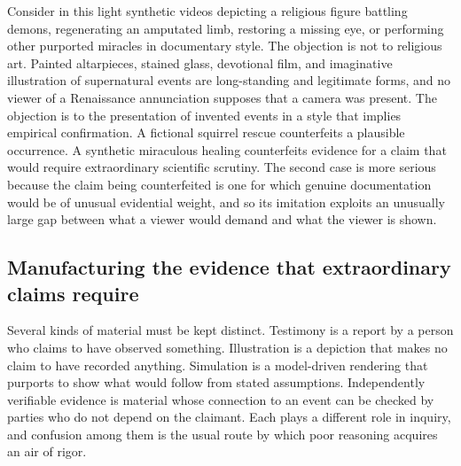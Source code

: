\documentclass[12pt]{article}
\theoremstyle{plain}
\theoremstyle{definition}
\theoremstyle{remark}
\begin{document}
Consider in this light synthetic videos depicting a religious figure battling demons, regenerating an amputated limb, restoring a missing eye, or performing other purported miracles in documentary style. The objection is not to religious art. Painted altarpieces, stained glass, devotional film, and imaginative illustration of supernatural events are long-standing and legitimate forms, and no viewer of a Renaissance annunciation supposes that a camera was present. The objection is to the presentation of invented events in a style that implies empirical confirmation. A fictional squirrel rescue counterfeits a plausible occurrence. A synthetic miraculous healing counterfeits evidence for a claim that would require extraordinary scientific scrutiny. The second case is more serious because the claim being counterfeited is one for which genuine documentation would be of unusual evidential weight, and so its imitation exploits an unusually large gap between what a viewer would demand and what the viewer is shown.

\subsection{Manufacturing the evidence that extraordinary claims require}

Several kinds of material must be kept distinct. Testimony is a report by a person who claims to have observed something. Illustration is a depiction that makes no claim to have recorded anything. Simulation is a model-driven rendering that purports to show what would follow from stated assumptions. Independently verifiable evidence is material whose connection to an event can be checked by parties who do not depend on the claimant. Each plays a different role in inquiry, and confusion among them is the usual route by which poor reasoning acquires an air of rigor.
\end{document}
